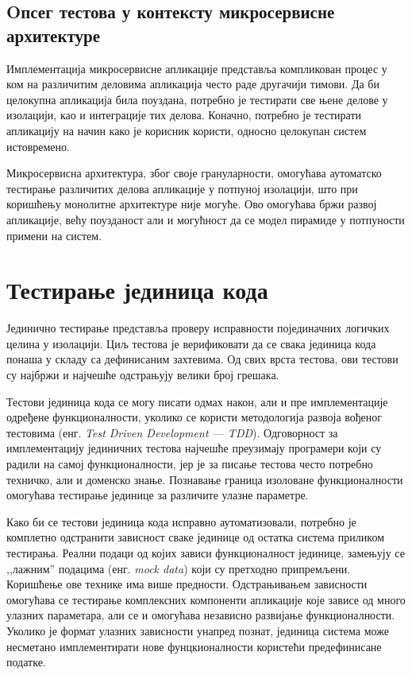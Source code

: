 \documentclass[12pt,oneside]{memoir}
\begin{document}
\subsection{Oпсег тестова у контексту микросервисне архитектуре}

Имплементација микросервисне апликације представља компликован процес у ком на различитим деловима апликација често раде другачији тимови. Да би целокупна апликација била поуздана, потребно је тестирати све њене делове у изолацији, као и интеграције тих делова. Коначно, потребно је тестирати апликацију на начин како је корисник користи, односно целокупан систем истовремено.

Микросервисна архитектура, због своје грануларности, омогућава аутоматско тестирање различитих делова апликације у потпуној изолацији, што при коришћењу монолитне архитектуре није могуће. Ово омогућава бржи развој апликације, већу поузданост али и могућност да се модел пирамиде у потпуности примени на систем. 

\section{Тестирање јединица кода}

Јединично тестирање представља проверу исправности појединачних логичких целина у изолацији. Циљ тестова је верификовати да се свака јединица кода понаша у складу са дефинисаним захтевима. Од свих врста тестова, ови тестови су најбржи и најчешће одстрањују велики број грешака. 

Тестови јединица кода се могу писати одмах након, али и пре имплементације одређене функционалности, уколико се користи методологија развоја вођеног тестовима (енг. \textit{Test Driven Development --- TDD}). Одговорност за имплементацију јединичних тестова најчешће преузимају програмери који су радили на самој функционалности, јер је за писање тестова често потребно техничко, али и доменско знање. Познавање граница изоловане функционалности омогућава тестирање  јединице за различите улазне параметре.

Како би се тестови јединица кода исправно аутоматизовали, потребно је комплетно одстранити зависност сваке јединице од остатка система приликом тестирања. Реални подаци од којих зависи функционалност јединице, замењују се ,,лажним” подацима (енг.\textit{ mock data}) који су претходно припремљени. Коришћење ове технике има више предности. Одстрањивањем зависности омогућава се тестирање комплексних компоненти апликације које зависе од много улазних параметара, али се и омогућава независно развијање функционалности. Уколико је формат улазних зависности унапред познат, јединица система може несметано имплементирати нове фунцкионалности користећи предефинисане податке.
\end{document}

